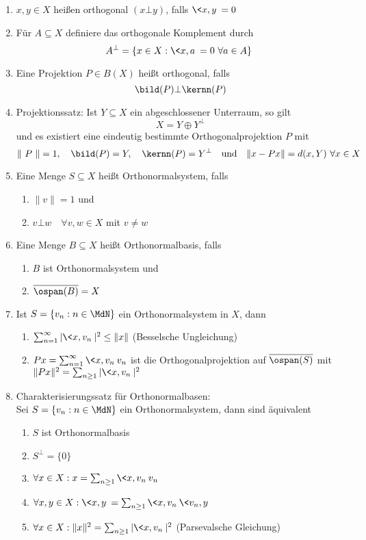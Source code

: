 \begin{enumerate}
	\item $x, y \in X$ hei{\ss}en orthogonal $(x \bot y)$, falls $\< x , y \> = 0$
	\item Für $A \subseteq X$ definiere das orthogonale Komplement durch
		\[ A^{\bot} = \{ x \in X : \< x , a \> = 0 ~ \forall a \in A \} \]
	\item Eine Projektion $P \in B(X)$ hei{\ss}t orthogonal, falls 
		\[ \bild(P) \bot \kernn(P) \]
	\item Projektionssatz: Ist $Y \subseteq X$ ein abgeschlossener Unterraum, so gilt
		 	\[ X = Y \oplus Y^{\bot} \]
		und es existiert eine eindeutig bestimmte Orthogonalprojektion $P$ mit
		\[ \| P \| = 1, \quad \bild(P) = Y, \quad \kernn(P) = Y^{\bot} \quad \text{und} \quad \| x - Px \| = d( x , Y) ~ \forall x \in X \]
	\item Eine Menge $S \subseteq X$ hei{\ss}t Orthonormalsystem, falls 
			\begin{enumerate}[label=\roman*\upshape)]
				\item $\| v \| = 1$ und
				\item $v \bot w \quad \forall v, w \in X$ mit $v \neq w$
			\end{enumerate}
	\item Eine Menge $B \subseteq X$ hei{\ss}t Orthonormalbasis, falls
			\begin{enumerate}[label=\roman*\upshape)]
				\item $B$ ist Orthonormalsystem und
				\item $\overline{\ospan(B)} = X$
			\end{enumerate}
	\item Ist $S = \{ v_{n} : n \in \MdN \}$ ein Orthonormalsystem in $X$, dann
		\begin{enumerate}[label=\roman*\upshape)]
			\item $\sum_{n = 1}^{\infty} | \< x , v_{n} \> |^{2} \leq \| x \|$ (Besselsche Ungleichung)
			\item $P x = \sum_{n = 1}^{\infty} \< x , v_{n} \> v_{n}$ ist die Orthogonalprojektion auf $\overline{\ospan(S)}$ mit $\| P x \|^{2} = \sum_{n \geq 1} | \< x , v_{n} \> |^{2}$
		\end{enumerate}
	\item Charakterisierungssatz für Orthonormalbasen: \\
		Sei $S = \{ v_{n} : n \in \MdN \}$ ein Orthonormalsystem, dann sind äquivalent
			\begin{enumerate}[label=\roman*\upshape)]
				\item $S$ ist Orthonormalbasis
				\item $S^{\bot} = \{ 0 \}$
				\item $\forall x \in X: x = \sum_{n \geq 1} \< x , v_{n} \> v_{n}$
				\item $\forall x , y \in X: \< x , y \> = \sum_{n \geq 1} \< x , v_{n} \> \< v_{n} , y \>$
				\item $\forall x \in X: \| x \|^{2} = \sum_{n \geq 1} | \< x , v_{n} \>|^{2}$ (Parsevalsche Gleichung) 
			\end{enumerate}
\end{enumerate}

